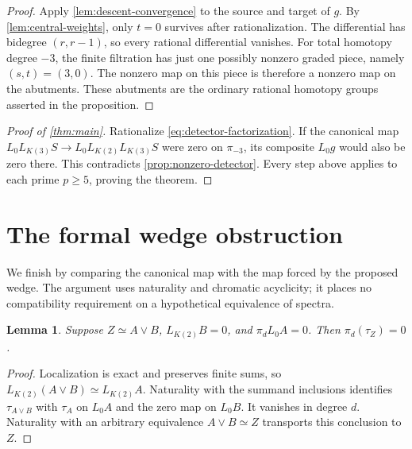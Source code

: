 \documentclass[11pt]{article}
\numberwithin{equation}{section}
\newtheorem{lemma}[theorem]{Lemma}
\theoremstyle{definition}
\theoremstyle{remark}
\begin{document}
\begin{proof}
Apply \cref{lem:descent-convergence} to the source and target of $g$.
By \cref{lem:central-weights}, only $t=0$ survives after rationalization.
The differential has bidegree $(r,r-1)$, so every rational differential
vanishes.  For total homotopy degree $-3$, the finite filtration has
just one possibly nonzero graded piece, namely $(s,t)=(3,0)$.
The nonzero map on this piece is therefore a nonzero map on the
abutments.  These abutments are the ordinary rational homotopy groups
asserted in the proposition.
\end{proof}

\begin{proof}[Proof of \cref{thm:main}]
Rationalize \eqref{eq:detector-factorization}.  If the canonical map
$L_0L_{K(3)}S\to L_0L_{K(2)}L_{K(3)}S$ were zero on $\pi_{-3}$,
its composite $L_0g$ would also be zero there.  This contradicts
\cref{prop:nonzero-detector}.  Every step above applies to each prime
$p\geq5$, proving the theorem.
\end{proof}

\section{The formal wedge obstruction}
\label{sec:wedge-obstruction}

We finish by comparing the canonical map with the map forced by the
proposed wedge. The argument uses naturality and chromatic acyclicity;
it places no compatibility requirement on a hypothetical equivalence
of spectra.

\begin{lemma}\label{lem:wedge-obstruction}
Suppose \(Z\simeq A\vee B\), \(L_{K(2)}B=0\), and
\(\pi_dL_0A=0\). Then \(\pi_d(\tau_Z)=0\).
\end{lemma}

\begin{proof}
Localization is exact and preserves finite sums, so
\(L_{K(2)}(A\vee B)\simeq L_{K(2)}A\).
Naturality with the summand inclusions identifies
\(\tau_{A\vee B}\) with \(\tau_A\) on \(L_0A\) and the zero map on
\(L_0B\). It vanishes in degree \(d\). Naturality with an arbitrary
equivalence \(A\vee B\simeq Z\) transports this conclusion to \(Z\).
\end{proof}
\end{document}
